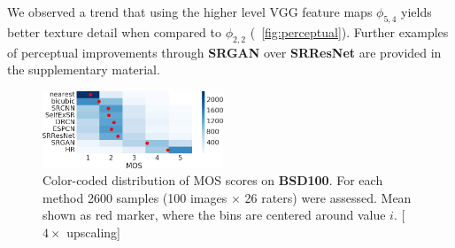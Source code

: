 \documentclass[10pt,twocolumn,letterpaper]{article}
\begin{document}
We observed a trend that using the higher level VGG feature maps $\phi_{5,4}$ yields better texture detail when compared to $\phi_{2,2}$ (\cf \figurename~\ref{fig:perceptual}).
Further examples of perceptual improvements through \textbf{SRGAN} over \textbf{SRResNet} are provided in the supplementary material.
\begin{figure}[ht!]
\includegraphics[width=0.48\textwidth]{images/used/jpg/MOS_heatmapcropped}
\caption{Color-coded distribution of MOS scores on \textbf{BSD100}. For each method 2600 samples (100 images $\times$ 26 raters) were assessed. Mean shown as red marker, where the bins are centered around value $i$. [$4\times$ upscaling]}
\label{fig:MOS}
\end{figure}
\end{document}
